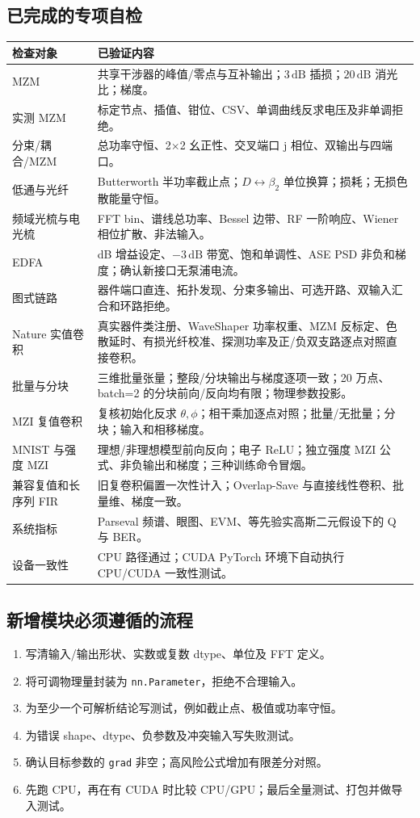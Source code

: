 \documentclass[11pt,a4paper,UTF8]{ctexart}
\newcommand{\pkg}[1]{\texttt{#1}}
\begin{document}
\subsection{已完成的专项自检}
\begin{longtable}{L{44mm}L{110mm}}
\toprule
\textbf{检查对象} & \textbf{已验证内容}\\
\midrule
\endhead
MZM & 共享干涉器的峰值/零点与互补输出；$3\,\mathrm{dB}$ 插损；$20\,\mathrm{dB}$ 消光比；梯度。\\
实测 MZM & 标定节点、插值、钳位、CSV、单调曲线反求电压及非单调拒绝。\\
分束/耦合/MZM & 总功率守恒、2$\times$2 幺正性、交叉端口 $\mathrm{j}$ 相位、双输出与四端口。\\
低通与光纤 & Butterworth 半功率截止点；$D\leftrightarrow\beta_2$ 单位换算；损耗；无损色散能量守恒。\\
频域光梳与电光梳 & FFT bin、谱线总功率、Bessel 边带、RF 一阶响应、Wiener 相位扩散、非法输入。\\
EDFA & dB 增益设定、$-3\,\mathrm{dB}$ 带宽、饱和单调性、ASE PSD 非负和梯度；确认新接口无泵浦电流。\\
图式链路 & 器件端口直连、拓扑发现、分束多输出、可选开路、双输入汇合和环路拒绝。\\
Nature 实值卷积 & 真实器件类注册、WaveShaper 功率权重、MZM 反标定、色散延时、有损光纤校准、探测功率及正/负双支路逐点对照直接卷积。\\
批量与分块 & 三维批量张量；整段/分块输出与梯度逐项一致；20 万点、batch=2 的分块前向/反向均有限；物理参数投影。\\
MZI 复值卷积 & 复核初始化反求 $\theta,\phi$；相干乘加逐点对照；批量/无批量；分块；输入和相移梯度。\\
MNIST 与强度 MZI & 理想/非理想模型前向反向；电子 ReLU；独立强度 MZI 公式、非负输出和梯度；三种训练命令冒烟。\\
兼容复值和长序列 FIR & 旧复卷积偏置一次性计入；Overlap-Save 与直接线性卷积、批量维、梯度一致。\\
系统指标 & Parseval 频谱、眼图、EVM、等先验实高斯二元假设下的 Q 与 BER。\\
设备一致性 & CPU 路径通过；CUDA PyTorch 环境下自动执行 CPU/CUDA 一致性测试。\\
\bottomrule
\end{longtable}

\subsection{新增模块必须遵循的流程}
\begin{enumerate}
\item 写清输入/输出形状、实数或复数 dtype、单位及 FFT 定义。
\item 将可调物理量封装为 \pkg{nn.Parameter}，拒绝不合理输入。
\item 为至少一个可解析结论写测试，例如截止点、极值或功率守恒。
\item 为错误 shape、dtype、负参数及冲突输入写失败测试。
\item 确认目标参数的 \pkg{grad} 非空；高风险公式增加有限差分对照。
\item 先跑 CPU，再在有 CUDA 时比较 CPU/GPU；最后全量测试、打包并做导入测试。
\end{enumerate}
\end{document}

